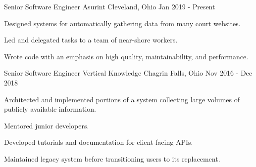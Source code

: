 


\begin{cventries}


\cventry
{Senior Software Engineer} %
{Asurint} %
{Cleveland, Ohio} %
{Jan 2019 - Present} %
{ %
\begin{cvitems}
\item {Designed systems for automatically gathering data from many court websites.}
\item {Led and delegated tasks to a team of near-shore workers.}
\item {Wrote code with an emphasis on high quality, maintainability, and performance.}
\end{cvitems}
}


\cventry
{Senior Software Engineer} %
{Vertical Knowledge} %
{Chagrin Falls, Ohio} %
{Nov 2016 - Dec 2018} %
{ %
\begin{cvitems}
\item {Architected and implemented portions of a system collecting large volumes of publicly available information.}
\item {Mentored junior developers.}
\item {Developed tutorials and documentation for client-facing APIs.}
\item {Maintained legacy system before transitioning users to its replacement.}
\end{cvitems}
}



\end{cventries}
